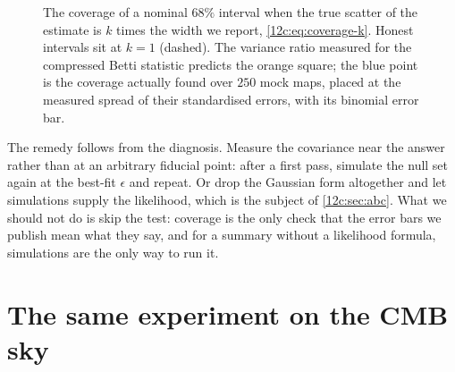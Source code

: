 \begin{figure}[htbp]
\centering
{}
\caption{The coverage of a nominal $68\%$ interval when the true scatter of the estimate is $k$ times the width we report,
\eqref{12c:eq:coverage-k}. Honest intervals sit at $k=1$ (dashed). The variance ratio measured for the compressed Betti statistic
predicts the orange square; the blue point is the coverage actually found over $250$ mock maps, placed at the measured spread of
their standardised errors, with its binomial error bar.}
\label{12c:fig:coverage}
\end{figure}

The remedy follows from the diagnosis. Measure the covariance near the answer rather than at an arbitrary fiducial point: after a
first pass, simulate the null set again at the best-fit $\epsilon$ and repeat. Or drop the Gaussian form altogether and let simulations
supply the likelihood, which is the subject of \cref{12c:sec:abc}. What we should not do is skip the test: coverage is the only check
that the error bars we publish mean what they say, and for a summary without a likelihood formula, simulations are the only way to
run it.
\section{The same experiment on the CMB sky}
\label{12c:sec:sphere}

